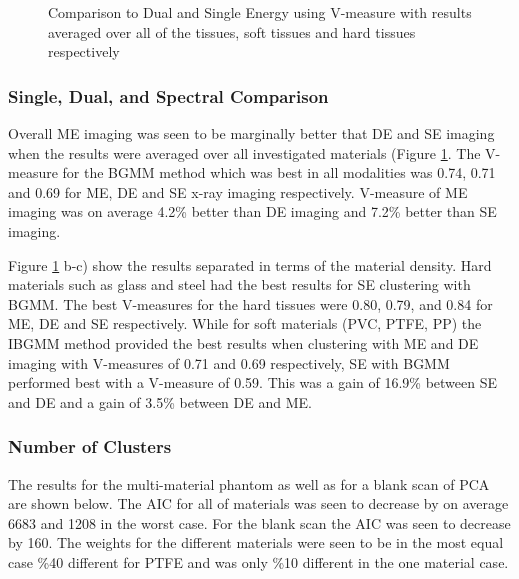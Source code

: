 \documentclass[a4paper,11pt]{article}
\begin{document}
\begin{figure}[t!]
\begin{subfigure}[b]{0.32\textwidth}
    \end{subfigure}
    \caption{Comparison to Dual and Single Energy using V-measure with results averaged over all of the tissues, soft tissues and hard tissues respectively}
    \label{results:hard_soft}
\end{figure}

\subsubsection{Single, Dual, and Spectral Comparison}

Overall ME imaging was seen to be marginally better that DE and SE imaging when the results were averaged over all investigated materials (Figure \ref{results:hard_soft}. The V-measure for the BGMM method which was best in all modalities was 0.74, 0.71 and 0.69 for ME, DE and SE x-ray imaging respectively. V-measure of ME imaging was on average 4.2\% better than DE imaging and 7.2\% better than SE imaging.



Figure \ref{results:hard_soft} b-c) show the results separated in terms of the material density. Hard materials such as glass and steel had the best results for SE clustering with BGMM. The best V-measures for the hard tissues were 0.80, 0.79, and 0.84 for ME, DE and SE respectively. While for soft materials (PVC, PTFE, PP) the IBGMM method provided the best results when clustering with ME and DE imaging with V-measures of 0.71 and 0.69 respectively, SE with BGMM performed best with a V-measure of 0.59. This was a gain of 16.9\% between SE and DE and a gain of 3.5\% between DE and ME.



\subsubsection{Number of Clusters}

The results for the multi-material phantom as well as for a blank scan of PCA are shown below. The AIC for all of materials was seen to decrease by on average 6683 and 1208 in the worst case. For the blank scan the AIC was seen to decrease by 160. The weights for the different materials were seen to be in the most equal case \%40 different for PTFE and was only \%10 different in the one material case.
\end{document}
